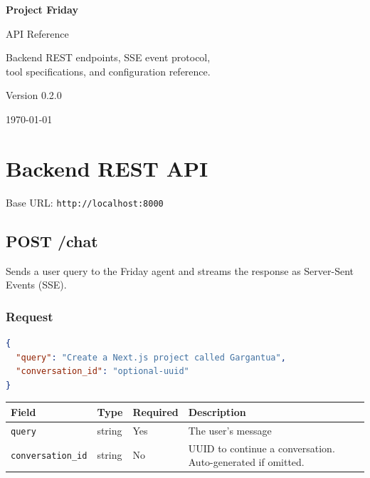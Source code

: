 \documentclass[11pt,a4paper]{article}
\newcommand{\httppost}{\textcolor{postorange}{\textbf{POST}}}
\begin{document}
\begin{titlepage}
\centering
\vspace*{3cm}
{\Huge\bfseries\color{fridaybrand} Project Friday\par}
\vspace{0.6cm}
{\Large API Reference\par}
\vspace{1.5cm}
{\large Backend REST endpoints, SSE event protocol,\\tool specifications, and configuration reference.\par}
\vspace{2cm}
{\normalsize Version 0.2.0\par}
{\normalsize \today\par}
\vfill
\end{titlepage}

\tableofcontents
\newpage

\section{Backend REST API}

Base URL: \texttt{http://localhost:8000}

\subsection{\httppost{} /chat}

Sends a user query to the Friday agent and streams the response as Server-Sent Events (SSE).

\subsubsection{Request}

\begin{lstlisting}[language=json,title={Request body}]
{
  "query": "Create a Next.js project called Gargantua",
  "conversation_id": "optional-uuid"
}
\end{lstlisting}

\begin{table}[h!]
\centering
\begin{tabular}{@{}llll@{}}
\toprule
\textbf{Field} & \textbf{Type} & \textbf{Required} & \textbf{Description} \\
\midrule
\texttt{query} & string & Yes & The user's message \\
\texttt{conversation\_id} & string & No & UUID to continue a conversation. Auto-generated if omitted. \\
\bottomrule
\end{tabular}
\end{table}
\end{document}
